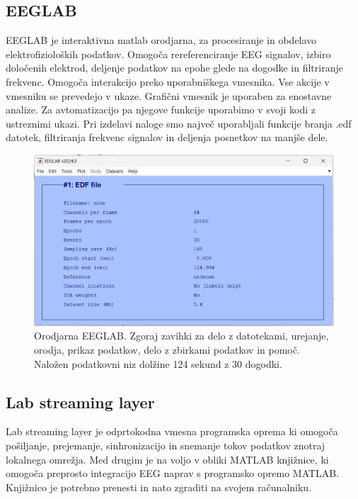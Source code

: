 \subsection{EEGLAB}
EEGLAB je interaktivna matlab orodjarna, za procesiranje in obdelavo elektrofizioloških podatkov. Omogoča rereferenciranje EEG signalov, izbiro določenih elektrod, deljenje podatkov na epohe glede na dogodke in filtriranje frekvenc. Omogoča interakcijo preko uporabniškega vmesnika. Vse akcije v vmesniku se prevedejo v ukaze. Grafični vmesnik je uporaben za enostavne analize. Za avtomatizacijo pa njegove funkcije uporabimo v svoji kodi z ustreznimi ukazi. Pri izdelavi naloge smo največ uporabljali funkcije branja .edf datotek, filtriranja frekvenc signalov in deljenja posnetkov na manjše dele.\cite{EEGLAB}
\begin{figure}[h!]
    \begin{center}
    \includegraphics[width=1\linewidth]{slike/EEGLAB.png}
    \end{center}
    \caption[Orodjarna EEGLAB.]{Orodjarna EEGLAB. Zgoraj zavihki za delo z datotekami, urejanje, orodja, prikaz podatkov, delo z zbirkami podatkov in pomoč. Naložen podatkovni niz dolžine 124 sekund z 30 dogodki.}
    \end{figure}

\subsection{Lab streaming layer}
Lab streaming layer je odprtokodna vmesna programska oprema ki omogoča pošiljanje, prejemanje, sinhronizacijo in snemanje tokov podatkov znotraj lokalnega omrežja. Med drugim je na voljo v obliki MATLAB knjižnice, ki omogoča preprosto integracijo EEG naprav s programsko opremo MATLAB. Knjižnico je potrebno prenesti in nato zgraditi na svojem računalniku.  \cite{Lslwebsite}

